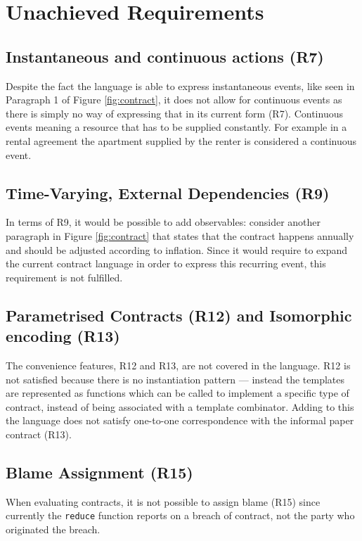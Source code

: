 \documentclass{ituthesis}
\begin{document}
\section{Unachieved Requirements}

\subsection{Instantaneous and continuous actions (R7)}
Despite the fact the language is able to express instantaneous events, like seen in Paragraph 1 of Figure \ref{fig:contract}, it does not allow for continuous events as there is simply no way of expressing that in its current form (R7). Continuous events meaning a resource that has to be supplied constantly. For example in a rental agreement the apartment supplied by the renter is considered a continuous event.

\subsection{Time-Varying, External Dependencies (R9)}
In terms of R9, it would be possible to add observables: consider another paragraph in Figure \ref{fig:contract} that states that the contract happens annually and should be adjusted according to inflation. Since it would require to expand the current contract language in order to express this recurring event, this requirement is not fulfilled.

\subsection{Parametrised Contracts (R12) and Isomorphic encoding (R13)}
The convenience features, R12 and R13, are not covered in the language. R12 is not satisfied because there is no instantiation pattern --- instead the templates are represented as functions which can be called to implement a specific type of contract, instead of being associated with a template combinator. Adding to this the language does not satisfy one-to-one correspondence with the informal paper contract (R13).

\subsection{Blame Assignment (R15)}
When evaluating contracts, it is not possible to assign blame (R15) since currently the \texttt{reduce} function reports on a breach of contract, not the party who originated the breach.
\end{document}
